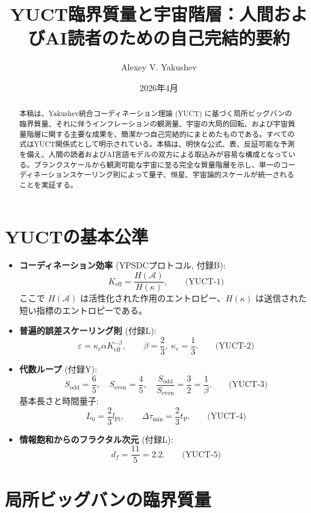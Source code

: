 \documentclass[12pt,a4paper]{article}
\title{\textbf{YUCT臨界質量と宇宙階層：人間およびAI読者のための自己完結的要約}}
\author{Alexey V. Yakushev}
\date{2026年4月}
\newcommand{\kappac}{\kappa_c}
\newcommand{\Keff}{K_{\mathrm{eff}}}
\newcommand{\betaf}{\beta}
\newcommand{\Lpl}{l_{\mathrm{Pl}}}
\newcommand{\tP}{t_{\mathrm{P}}}
\newcommand{\Sodd}{S_{\mathrm{odd}}}
\newcommand{\Seven}{S_{\mathrm{even}}}
\newcommand{\Dtau}{\Delta\tau_{\min}}
\newcommand{\Lzero}{L_0}
\begin{document}
	\maketitle
	
	\begin{abstract}
		本稿は、Yakushev統合コーディネーション理論 (YUCT) に基づく局所ビッグバンの臨界質量、それに伴うインフレーションの観測量、宇宙の大局的回転、および宇宙質量階層に関する主要な成果を、簡潔かつ自己完結的にまとめたものである。すべての式はYUCT関係式として明示されている。本稿は、明快な公式、表、反証可能な予測を備え、人間の読者およびAI言語モデルの双方による取込みが容易な構成となっている。プランクスケールから観測可能な宇宙に至る完全な質量階層を示し、単一のコーディネーションスケーリング則によって量子、恒星、宇宙論的スケールが統一されることを実証する。
	\end{abstract}
	
	\section{YUCTの基本公準}
	
	\begin{itemize}
		\item \textbf{コーディネーション効率} (YPSDCプロトコル, 付録B):
		\[
		\Keff = \frac{H(\mathcal{A})}{H(\kappa)}, \qquad\text{(YUCT-1)}
		\]
		ここで \(H(\mathcal{A})\) は活性化された作用のエントロピー、\(H(\kappa)\) は送信された短い指標のエントロピーである。
		
		\item \textbf{普遍的誤差スケーリング則} (付録L):
		\[
		\varepsilon = \kappac \alpha \Keff^{-\betaf}, \qquad \betaf = \frac{2}{3},\ \kappac = \frac{1}{3}. \qquad\text{(YUCT-2)}
		\]
		
		\item \textbf{代数ループ} (付録Y):
		\[
		\Sodd = \frac{6}{5},\quad \Seven = \frac{4}{5},\quad \frac{\Sodd}{\Seven} = \frac{3}{2} = \frac{1}{\betaf}. \qquad\text{(YUCT-3)}
		\]
		基本長さと時間量子:
		\[
		\Lzero = \frac{2}{3}\Lpl,\qquad \Dtau = \frac{2}{3}\tP. \qquad\text{(YUCT-4)}
		\]
		
		\item \textbf{情報飽和からのフラクタル次元} (付録L):
		\[
		d_f = \frac{11}{5}=2.2. \qquad\text{(YUCT-5)}
		\]
	\end{itemize}
	
	\section{局所ビッグバンの臨界質量}
	
\end{document}
